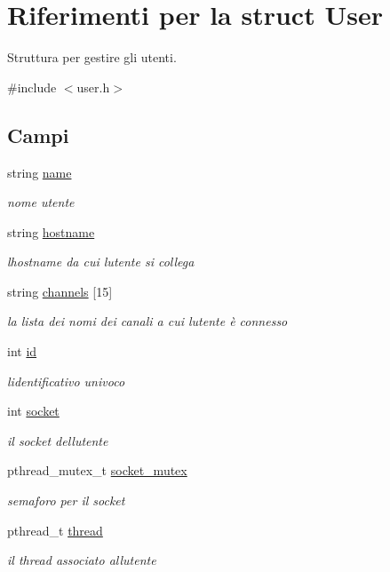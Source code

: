 \hypertarget{structUser}{}\section{Riferimenti per la struct User}
\label{structUser}


Struttura per gestire gli utenti.  




{\ttfamily \#include $<$user.\+h$>$}

\subsection*{Campi}
\begin{DoxyCompactItemize}
\item 
string \hyperlink{structUser_a643f85779a4693855c171c396f49e515}{name}
\begin{DoxyCompactList}\small\item\em nome utente \end{DoxyCompactList}\item 
string \hyperlink{structUser_a3d93ac6426bd7cf28311701e86fcafc0}{hostname}
\begin{DoxyCompactList}\small\item\em l\textquotesingle{}hostname da cui l\textquotesingle{}utente si collega \end{DoxyCompactList}\item 
string \hyperlink{structUser_a9a7de05da34bb5f91e9e85a396a86462}{channels} \mbox{[}15\mbox{]}
\begin{DoxyCompactList}\small\item\em la lista dei nomi dei canali a cui l\textquotesingle{}utente è connesso \end{DoxyCompactList}\item 
int \hyperlink{structUser_aa7e6e39b43020bbe9c3a196b3689b0f7}{id}
\begin{DoxyCompactList}\small\item\em l\textquotesingle{}identificativo univoco \end{DoxyCompactList}\item 
int \hyperlink{structUser_a43525e5e65a2388d5d1239bf62f256fb}{socket}
\begin{DoxyCompactList}\small\item\em il socket dell\textquotesingle{}utente \end{DoxyCompactList}\item 
pthread\+\_\+mutex\+\_\+t \hyperlink{structUser_a88aa1435ade9479d9229a6d251152bde}{socket\+\_\+mutex}
\begin{DoxyCompactList}\small\item\em semaforo per il socket \end{DoxyCompactList}\item 
pthread\+\_\+t \hyperlink{structUser_aa75a447467f6811a2d8a2c967e1a6de8}{thread}
\begin{DoxyCompactList}\small\item\em il thread associato all\textquotesingle{}utente \end{DoxyCompactList}\end{DoxyCompactItemize}


